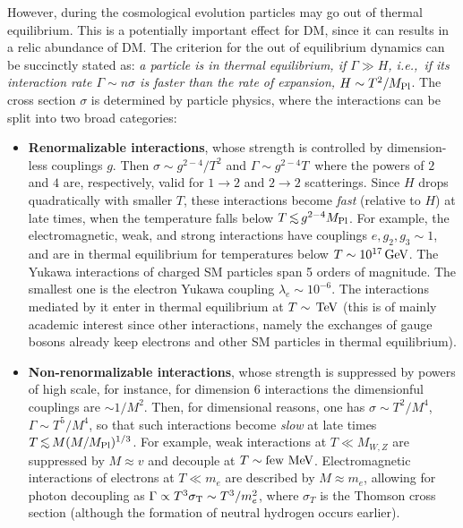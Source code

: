 However, during the cosmological evolution particles may go out of
thermal equilibrium. This is a potentially important effect for DM, since it can results in a relic abundance of DM. 
The criterion for the out of equilibrium dynamics can be succinctly stated as: {\em a particle is in thermal equilibrium, if $\Gamma \gg H$,
i.e.,\ if its interaction rate $\Gamma \sim n \sigma$ is faster than the rate of expansion, $H \sim T^2/M_{\rm Pl}$}.
The cross section $\sigma$ is determined by particle physics, where the interactions can be split into two broad categories:
\begin{itemize}
\item {\bf Renormalizable interactions}, whose strength is controlled by 
dimension-less couplings $g$.  Then
$\sigma \sim g^{2 -  4}/T^2$ and $\Gamma \sim g^{2 - 4} T$\
where the powers of $2$ and $4$ are, respectively, valid for $1\to 2$ and $2\to 2$ scatterings.
Since $H$ drops quadratically with smaller $T$, these interactions become {\em fast} (relative to $H$) at late times, when the temperature falls below
$T \circa{<} g^{2 - 4} M_{\rm Pl}$.  
For example, the electromagnetic, weak, and strong interactions have couplings
$e,g_2,g_3\sim 1$, and are in thermal equilibrium  for temperatures below $T \sim 10^{17}\,{\rm GeV}$.
The Yukawa interactions of charged SM particles span 5 orders of magnitude. The smallest one is the electron Yukawa coupling
$\lambda_e \sim 10^{-6}$. The interactions mediated by it enter in thermal equilibrium at $T\sim \,{\rm TeV}$ (this is of mainly academic interest since other interactions, namely the exchanges of gauge bosons already keep electrons and other SM particles in thermal equilibrium).

\item {\bf Non-renormalizable interactions}, whose strength is suppressed by powers of high scale, for instance, for dimension 6 interactions the dimensionful couplings are $\sim1/M^2$.
Then, for dimensional reasons, one has $\sigma\sim T^2/M^4$, $\Gamma \sim T^5/M^4$, so that such interactions become {\em slow} at late times $T\circa{<} M (M/M_{\rm Pl})^{1/3}$.
For example,  weak interactions at $T\ll M_{W,Z}$ are suppressed by $M\approx v$
and decouple at $T \sim\hbox{few MeV}$.
Electromagnetic interactions of electrons at $T\ll m_e$ are described by $M\approx m_e$,
allowing for photon decoupling
as $\Gamma \propto T^3 \sigma_{\rm T}\sim T^3/m_e^2$, where $\sigma_T$ is the Thomson cross section (although the formation of neutral hydrogen occurs earlier).



\end{itemize}
